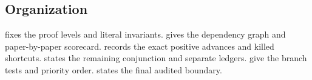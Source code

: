 \subsection{Organization}

 fixes the proof levels and literal
invariants.   gives the dependency graph
and paper-by-paper scorecard.   records the
exact positive advances and killed shortcuts.
 states the remaining conjunction and
separate ledgers.   give the
branch tests and priority order.   states the
final audited boundary.
